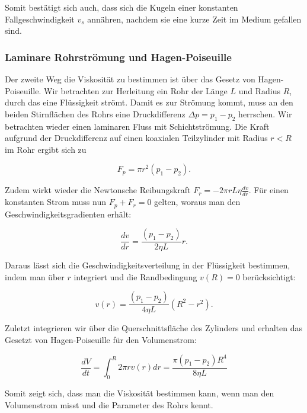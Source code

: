 \documentclass{article}
\begin{document}
Somit bestätigt sich auch, dass sich die Kugeln einer konstanten Fallgeschwindigkeit $v_s$ annähren, nachdem sie eine kurze Zeit im Medium gefallen sind. 

\subsubsection{Laminare Rohrströmung und Hagen-Poiseuille}

Der zweite Weg die Viskosität zu bestimmen ist über das Gesetz von Hagen-Poiseuille. Wir betrachten zur Herleitung ein Rohr der Länge $L$ und Radius $R$, durch das eine Flüssigkeit strömt. Damit es zur Strömung kommt, muss an den beiden Stirnflächen des Rohrs eine Druckdifferenz $\Delta p = p_1 - p_2$ herrschen. Wir betrachten wieder einen laminaren Fluss mit Schichtströmung. Die Kraft aufgrund der Druckdifferenz auf einen koaxialen Teilzylinder mit Radius $r<R$ im Rohr ergibt sich zu

\begin{equation}
    F_p = \pi r^2 (p_1 - p_2).
\end{equation}

Zudem wirkt wieder die Newtonsche Reibungskraft $F_r = - 2 \pi r L \eta \frac{dv}{dr}$. Für einen konstanten Strom muss nun $F_p + F_r = 0$ gelten, woraus man den Geschwindigkeitsgradienten erhält:

\begin{equation}
    \frac{dv}{dr} = \frac{(p_1 - p_2)}{2 \eta L} r.
\end{equation}

Daraus lässt sich die Geschwindigkeitsverteilung in der Flüssigkeit bestimmen, indem man über $r$ integriert und die Randbedingung $v(R) = 0$ berücksichtigt:

\begin{equation}
    v(r) = \frac{(p_1 - p_2)}{4 \eta L} (R^2 - r^2).
\end{equation}

Zuletzt integrieren wir über die Querschnittsfläche des Zylinders und erhalten das Gesetzt von Hagen-Poiseuille für den Volumenstrom:

\begin{equation}
    \frac{dV}{dt} = \int_0^R 2 \pi r v(r) dr = \frac{\pi (p_1 - p_2) R^4}{8 \eta L}
    \label{eq:HagPois}
\end{equation}

Somit zeigt sich, dass man die Viskosität bestimmen kann, wenn man den Volumenstrom misst und die Parameter des Rohrs kennt.
\end{document}
